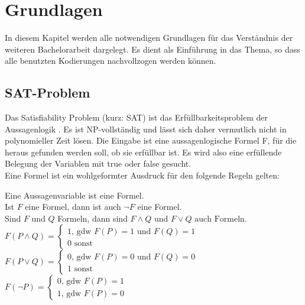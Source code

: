 \documentclass[a4,abstract=on]{scrartcl}
\newcommand*\stdsection{}
\let\stdsection\section
\renewcommand*\section{%
    \clearpage\ifodd\value{page}\else\mbox{}\clearpage\fi
    \stdsection}
\begin{document}
\section{Grundlagen}
In diesem Kapitel werden alle notwendigen Grundlagen für das Verständnis der weiteren Bachelorarbeit dargelegt. Es dient als Einführung in das Thema, so dass alle benutzten Kodierungen nachvollzogen werden können.
\subsection{SAT-Problem}
Das Satisfiability Problem (kurz: SAT) ist das Erfüllbarkeitsproblem der Aussagenlogik \cite[vgl.][]{sat-problem}. Es ist NP-vollständig und lässt sich daher vermutlich nicht in polynomieller Zeit lösen. Die Eingabe ist eine aussagenlogische Formel F, für die heraus gefunden werden soll, ob sie erfüllbar ist. Es wird also eine erfüllende Belegung der Variablen mit true oder false gesucht.\\
Eine Formel ist ein wohlgeformter Ausdruck für den folgende Regeln gelten:

\begin{mdframed} [linecolor=black,linewidth=2pt]
Eine Aussagenvariable ist eine Formel.\\
Ist $F$ eine Formel, dann ist auch  $\neg F$  eine Formel.\\
Sind $F$ und  $Q$  Formeln, dann sind
$F \wedge Q  \text{ und }  F \vee Q \text{ auch Formeln.}$\\
$F(P\wedge Q) = \begin{cases}1 \text{, gdw } F(P) = 1 \text{ und } F(Q)=1\\ 0 \text{ sonst}\end{cases}$\\
$F(P\vee Q) = \begin{cases}0 \text{, gdw } F(P) = 0 \text{ und } F(Q)=0\\ 1 \text{ sonst}\end{cases}$\\
$F(\neg P) = \begin{cases}0 \text{, gdw } F(P) = 1 \\ 1 \text{, gdw } F(P) = 0\end{cases}$
\end{mdframed}
\end{document}
